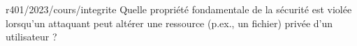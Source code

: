 \begin{question}{r401/2023/cours/integrite}
  Quelle propriété fondamentale de la sécurité est violée lorsqu'un
  attaquant peut altérer une ressource (p.ex., un fichier) privée d'un
  utilisateur ?
  \begin{reponseshoriz}
  \end{reponseshoriz}
\end{question}
